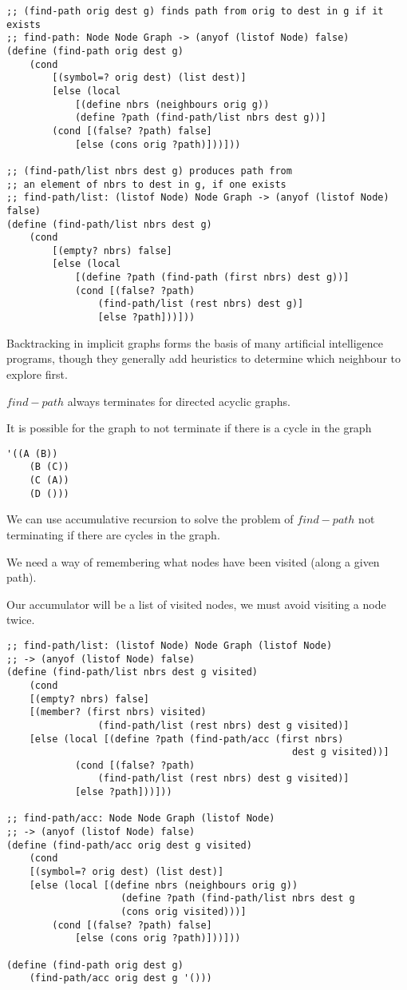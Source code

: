 \documentclass{article}
\begin{document}
\begin{lstlisting}
;; (find-path orig dest g) finds path from orig to dest in g if it exists 
;; find-path: Node Node Graph -> (anyof (listof Node) false)
(define (find-path orig dest g)
    (cond 
        [(symbol=? orig dest) (list dest)]
        [else (local 
            [(define nbrs (neighbours orig g))
            (define ?path (find-path/list nbrs dest g))] 
        (cond [(false? ?path) false]
            [else (cons orig ?path)]))]))

;; (find-path/list nbrs dest g) produces path from
;; an element of nbrs to dest in g, if one exists
;; find-path/list: (listof Node) Node Graph -> (anyof (listof Node) false) 
(define (find-path/list nbrs dest g)
    (cond 
        [(empty? nbrs) false]
        [else (local 
            [(define ?path (find-path (first nbrs) dest g))]
            (cond [(false? ?path)
                (find-path/list (rest nbrs) dest g)]
                [else ?path]))]))
\end{lstlisting}

Backtracking in implicit graphs forms the basis of many artificial intelligence programs, though they generally add heuristics to determine which neighbour to explore first. 

$find-path$ always terminates for directed acyclic graphs. 

It is possible for the graph to not terminate if there is a cycle in the graph

\begin{lstlisting}
'((A (B))
    (B (C))
    (C (A))
    (D ()))
\end{lstlisting}

We can use accumulative recursion to solve the problem of $find-path$ not terminating if there are cycles in the graph. 

We need a way of remembering what nodes have been visited (along a given path). 

Our accumulator will be a list of visited nodes, we must avoid visiting a node twice. 

\begin{lstlisting}
;; find-path/list: (listof Node) Node Graph (listof Node)
;; -> (anyof (listof Node) false)
(define (find-path/list nbrs dest g visited)
    (cond 
    [(empty? nbrs) false]
    [(member? (first nbrs) visited)
                (find-path/list (rest nbrs) dest g visited)]
    [else (local [(define ?path (find-path/acc (first nbrs)
                                                  dest g visited))]
            (cond [(false? ?path)
                (find-path/list (rest nbrs) dest g visited)]
            [else ?path]))]))

;; find-path/acc: Node Node Graph (listof Node) 
;; -> (anyof (listof Node) false) 
(define (find-path/acc orig dest g visited)
    (cond 
    [(symbol=? orig dest) (list dest)]
    [else (local [(define nbrs (neighbours orig g))
                    (define ?path (find-path/list nbrs dest g
                    (cons orig visited)))]
        (cond [(false? ?path) false]
            [else (cons orig ?path)]))]))

(define (find-path orig dest g)
    (find-path/acc orig dest g '()))
\end{lstlisting}
\end{document}
